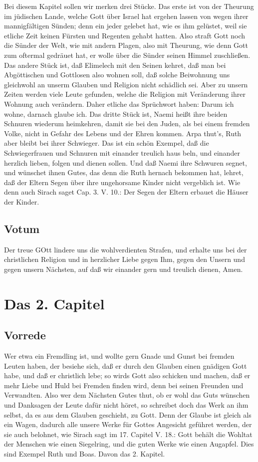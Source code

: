 Bei diesem Kapitel sollen wir merken drei Stücke. Das erste ist von der Theurung im jüdischen Lande, welche Gott über Israel hat ergehen lassen von wegen ihrer mannigfältigen Sünden; denn ein jeder gelebet hat, wie es ihm gelüstet, weil sie etliche Zeit keinen Fürsten und Regenten gehabt hatten. Also straft Gott noch die Sünder der Welt, wie mit andern Plagen, also mit Theurung, wie denn Gott zum oftermal gedräuet hat, er wolle über die Sünder seinen Himmel zuschließen. Das andere Stück ist, daß Elimelech mit den Seinen kehret, daß man bei Abgöttischen und Gottlosen also wohnen soll, daß solche Beiwohnung uns gleichwohl an unserm Glauben und Religion nicht schädlich sei. Aber zu unsern Zeiten werden viele Leute gefunden, welche die Religion mit Veränderung ihrer Wohnung auch verändern. Daher etliche das Sprüchwort haben: Darum ich wohne, darnach glaube ich. Das dritte Stück ist, Naemi heißt ihre beiden Schnuren wiederum heimkehren, damit sie bei den Juden, als bei einem fremden Volke, nicht in Gefahr des Lebens und der Ehren kommen. Arpa thut's, Ruth aber bleibt bei ihrer Schwieger. Das ist ein schön Exempel, daß die Schwiegerfrauen und Schnuren mit einander treulich haus
beln, und einander herzlich lieben, folgen und dienen sollen. Und daß Naemi ihre Schwuren segnet, und wünschet ihnen Gutes, das denn die Ruth hernach bekommen hat, lehret, daß der Eltern Segen über ihre ungehorsame Kinder nicht vergeblich ist. Wie denn auch Sirach saget Cap. 3. V. 10.: Der Segen der Eltern erbauet die Häuser der Kinder.

\section{Votum}

Der treue GOtt lindere uns die wohlverdienten Strafen, und erhalte uns bei der christlichen Religion und in herzlicher Liebe gegen Ihm, gegen den Unsern und gegen unsern Nächsten, auf daß wir einander gern und treulich dienen, Amen.

\chapter{Das 2. Capitel}

\section{Vorrede}

Wer etwa ein Fremdling ist, und wollte gern Gnade und Gunst bei fremden Leuten haben, der besiehe sich, daß er durch den Glauben einen gnädigen Gott habe, und daß er christlich lebe; so wirds Gott also schicken und machen, daß er mehr Liebe und Huld bei Fremden finden wird, denn bei seinen Freunden und Verwandten. Also wer dem Nächsten Gutes thut, ob er wohl das Guts wünschen und Danksagen der Leute dafür nicht höret, so schreibet doch das Werk an ihm selbst, da es aus dem Glauben geschieht, zu Gott. Denn der Glaube ist gleich als ein Wagen, dadurch alle unsere Werke für Gottes Angesicht geführet werden, der sie auch belohnet, wie Sirach sagt im 17. Capitel V. 18.: Gott behält die Wohltat der Menschen wie einen Siegelring, und die guten Werke wie einen Augapfel. Dies sind Exempel Ruth und Boas. Davon das 2. Kapitel.

